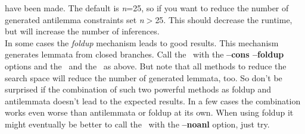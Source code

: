\begin{description}
{      have been made. The default is {\it n\/}=25, so if you want to
      reduce the number of generated antilemma constraints set {\it
      n\/}$>$25. This should decrease the runtime, but will increase
      the number of inferences.\\
      In some cases the {\it foldup\/} mechanism leads to good
      results. This mechanism generates lemmata from closed
      branches. Call the \inw\ with the {\bf --cons --foldup} options 
      and the \wasm\ and the \sam\ as above. But note that all methods
      to reduce the search space will reduce the number of generated
      lemmata, too. So don't be surprised if the combination of such
      two powerful methods as foldup and antilemmata doesn't lead to
      the expected results. In a few cases the combination works even 
      worse than antilemmata or foldup at its own. When using foldup 
      it might eventually be better to call the \sam\ with the {\bf
      --noanl} option, just try.}  
\end{description}



